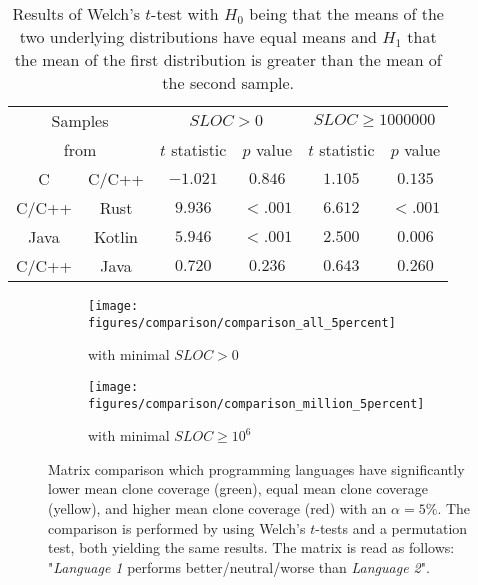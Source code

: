 \begin{table}[tbh!]
	\centering
	\begin{tabular}{|cc||c|c||c|c|}
		\hline
		\multicolumn{2}{|c||}{Samples} & \multicolumn{2}{c||}{$SLOC > 0$} & \multicolumn{2}{c|}{$SLOC \geq 1000000$}  \\
		\multicolumn{2}{|c||}{from} & \multicolumn{1}{c}{$t$ statistic} & \multicolumn{1}{c||}{$p$ value} & \multicolumn{1}{c}{$t$ statistic} & $p$ value \\
		\hline
		\hline
		C & C/C++ & $-1.021$ & $0.846$ & $1.105$ & $0.135$ \\
		\hline
		\hline
		C/C++ & Rust & $9.936$ & $<.001$ & $6.612$ & $<.001$ \\
		\hline
		Java & Kotlin & $5.946$ & $<.001$ & $2.500$ & $0.006$ \\
		\hline
		\hline
		C/C++ & Java & $0.720$ & $0.236$ & $0.643$ & $0.260$ \\
		\hline
	\end{tabular}
	\caption{Results of Welch's $t$-test with $H_0$ being that the means of the two underlying distributions have equal means and $H_1$ that the mean of the first distribution is greater than the mean of the second sample.}
	\label{tab:stat_test}
\end{table}

\begin{figure}[tbh!]
	\centering
	\begin{subfigure}[t]{0.49\textwidth}
		\texttt{[image: figures/comparison/comparison\_all\_5percent]}
		\caption{with minimal $SLOC > 0$}
		\label{fig:matrix_comp_all}
	\end{subfigure}
	\hfill
	\begin{subfigure}[t]{0.49\textwidth}
		\texttt{[image: figures/comparison/comparison\_million\_5percent]}
		\caption{with minimal $SLOC \geq 10^{6}$}
		\label{fig:matrix_comp_million}
	\end{subfigure}
	\caption{Matrix comparison which programming languages have significantly lower mean clone coverage (green), equal mean clone coverage (yellow), and higher mean clone coverage (red) with an $\alpha=5\%$. The comparison is performed by using Welch's $t$-tests and a permutation test, both yielding the same results. The matrix is read as follows: "\textit{Language 1} performs better/neutral/worse than \textit{Language 2}".}
	\label{fig:matrix_comp}
\end{figure}


